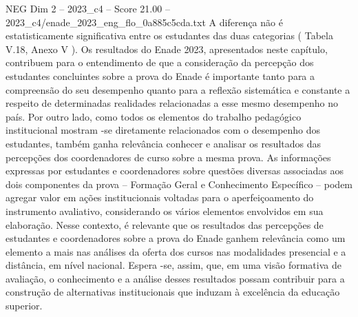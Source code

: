 \begin{textsample}{NEG Dim 2 – 2023\_c4 – Score 21.00 – 2023\_c4/enade\_2023\_eng\_flo\_0a885c5cda.txt}
A diferença não é estatisticamente significativa entre os estudantes das duas categorias ( Tabela V.18, Anexo V ).
Os resultados do Enade 2023, apresentados neste capítulo, contribuem para o entendimento de que a consideração da percepção dos estudantes concluintes sobre a prova do Enade é importante tanto para a compreensão do seu desempenho quanto para a reflexão sistemática e constante a respeito de determinadas realidades relacionadas a esse mesmo desempenho no país.
Por outro lado, como todos os elementos do trabalho pedagógico institucional mostram -se diretamente relacionados com o desempenho dos estudantes, também ganha relevância conhecer e analisar os resultados das percepções dos coordenadores de curso sobre a mesma prova.
As informações expressas por estudantes e coordenadores sobre questões diversas associadas aos dois componentes da prova – Formação Geral e Conhecimento Específico – podem agregar valor em ações institucionais voltadas para o aperfeiçoamento do instrumento avaliativo, considerando os vários elementos envolvidos em sua elaboração.
Nesse contexto, é relevante que os resultados das percepções de estudantes e coordenadores sobre a prova do Enade ganhem relevância como um elemento a mais nas análises da oferta dos cursos nas modalidades presencial e a distância, em nível nacional.
Espera -se, assim, que, em uma visão formativa de avaliação, o conhecimento e a análise desses resultados possam contribuir para a construção de alternativas institucionais que induzam à excelência da educação superior.

\end{textsample}
